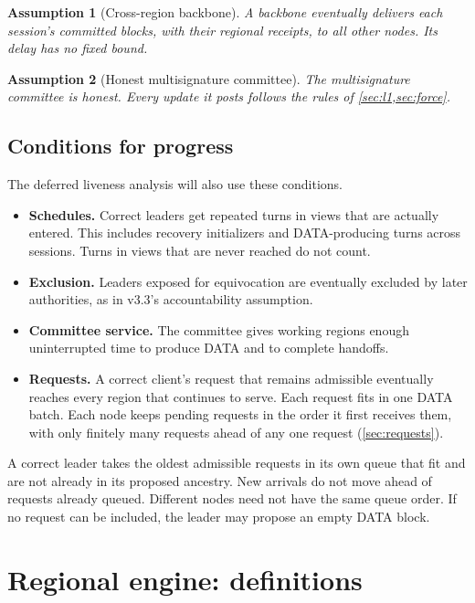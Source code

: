 \documentclass[11pt,a4paper]{article}
\newtheorem{assumption}[assumption]{Assumption}
\begin{document}
\begin{assumption}[Cross-region backbone]
\label{ass:backbone}
A backbone eventually delivers each session's committed blocks, with
their regional receipts, to all other nodes. Its delay has no fixed
bound.
\end{assumption}

\begin{assumption}[Honest multisignature committee]
\label{ass:committee}
The multisignature committee is honest. Every update it posts follows
the rules of \cref{sec:l1,sec:force}.
\end{assumption}

\subsection{Conditions for progress}
\label{sec:progress}
The deferred liveness analysis will also use these conditions.
\begin{itemize}
\item \textbf{Schedules.} Correct leaders get repeated turns in views
that are actually entered. This includes recovery initializers and
DATA-producing turns across sessions. Turns in views that are never
reached do not count. 
\item \textbf{Exclusion.} Leaders exposed for equivocation are eventually
excluded by later authorities, as in v3.3's accountability assumption.
\item \textbf{Committee service.} The committee gives working regions
enough uninterrupted time to produce DATA and to complete handoffs.
\item \textbf{Requests.} A correct client's request that remains
admissible eventually reaches every region that continues to serve.
Each request fits in one DATA batch. Each node keeps pending requests
in the order it first receives them, with only finitely many requests
ahead of any one request (\cref{sec:requests}).
\end{itemize}
A correct leader takes the oldest admissible requests in its own queue
that fit and are not already in its proposed ancestry. New arrivals do
not move ahead of requests already queued. Different nodes need not
have the same queue order. If no request can be included, the leader
may propose an empty DATA block.

\section{Regional engine: definitions}
\label{sec:regional}
\end{document}
